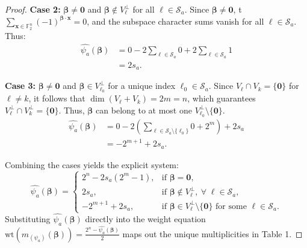 \documentclass[pdflatex,sn-mathphys-num]{sn-jnl}%
\theoremstyle{thmstyleone}%
\theoremstyle{thmstyletwo}%
\theoremstyle{thmstylethree}%
\begin{document}
\begin{proof}
\textbf{Case 2:} $\mathbf{\beta} \neq \mathbf{0}$ and $\mathbf{\beta} \notin V_\ell^\perp$ for all $\ell \in \mathcal{S}_a$.
Since $\mathbf{\beta} \neq \mathbf{0}$, t$\sum_{\mathbf{x} \in \mathbb{F}_2^n} (-1)^{\mathbf{\beta} \cdot \mathbf{x}} = 0$, and the subspace character sums vanish for all $\ell \in \mathcal{S}_a$. Thus:
\begin{align*}
\widehat{\psi_a}(\mathbf{\beta}) &= 0 - 2 \sum_{\ell \in \mathcal{S}_a} 0 + 2\sum_{\ell \in \mathcal{S}_a} 1 \\
&= 2s_a.
\end{align*}

\textbf{Case 3:} $\mathbf{\beta} \neq \mathbf{0}$ and $\mathbf{\beta} \in V_{\ell_0}^\perp$ for a unique index $\ell_0 \in \mathcal{S}_a$. 
Since $V_\ell \cap V_k = \{\mathbf{0}\}$ for $\ell \neq k$, it follows that $\dim(V_\ell + V_k) = 2m = n$, which guarantees $V_\ell^\perp \cap V_k^\perp = \{\mathbf{0}\}$. Thus, $\mathbf{\beta}$ can belong to at most one $V_{\ell_0}^\perp \setminus \{\mathbf{0}\}$.
\begin{align*}
\widehat{\psi_a}(\mathbf{\beta}) &= 0 - 2 \left( \sum_{\ell \in \mathcal{S}_a \setminus \{\ell_0\}} 0 + 2^m \right) + 2s_a \\
&= -2^{m+1} + 2s_a.
\end{align*}

Combining the cases yields the explicit system:
\[
\widehat{\psi_a}(\mathbf{\beta})=
\begin{cases}
2^n-2s_a(2^m-1), & \text{if } \mathbf{\beta}=\mathbf{0},\\
2s_a, & \text{if } \mathbf{\beta}\notin V_\ell^\perp,\ \forall \; \ell\in \mathcal{S}_a,\\
-2^{m+1}+2s_a, & \text{if } \mathbf{\beta}\in V_\ell^\perp\setminus\{\mathbf{0}\} \text{ for some } \ell\in \mathcal{S}_a.
\end{cases}
\]
Substituting $\widehat{\psi_a}(\mathbf{\beta})$ directly into the weight equation $\mathrm{wt}(m_{(\psi_a)}(\mathbf{\beta})) = \frac{2^n - \widehat{\psi_a}(\mathbf{\beta})}{2}$ maps out the unique multiplicities in Table 1.
\end{proof}
\end{document}
